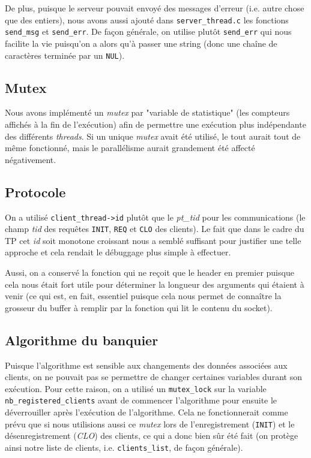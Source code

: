 \documentclass[11pt]{article}
\begin{document}
De plus, puisque le serveur pouvait envoyé des messages d'erreur (i.e. autre chose que des entiers), nous avons aussi ajouté dans \texttt{server\_thread.c} les fonctions \texttt{send\_msg} et \texttt{send\_err}. De façon générale, on utilise plutôt \texttt{send\_err} qui nous facilite la vie puisqu'on a alors qu'à passer une string (donc une chaîne de caractères terminée par un \texttt{NUL}).

\subsection{Mutex}

Nous avons implémenté un \textit{mutex} par "variable de statistique" (les compteurs affichés à la fin de l'exécution) afin de permettre une exécution plus indépendante des différents \textit{threads}. Si un unique \textit{mutex} avait été utilisé, le tout aurait tout de même fonctionné, mais le parallélisme aurait grandement été affecté négativement.


\subsection{Protocole}

On a utilisé \texttt{client\_thread->id} plutôt que le \textit{pt\_tid} pour les communications (le champ \textit{tid} des requêtes \texttt{INIT}, \texttt{REQ} et \texttt{CLO} des clients). Le fait que dans le cadre du TP cet \textit{id} soit monotone croissant nous a semblé suffisant pour justifier une telle approche et cela rendait le débuggage plus simple à effectuer.

Aussi, on a conservé la fonction qui ne reçoit que le header en premier puisque cela nous était fort utile pour déterminer la longueur
des arguments qui étaient à venir (ce qui est, en fait, essentiel puisque cela nous permet de connaître la grosseur du buffer à remplir par la fonction qui lit le contenu du socket).


\subsection{Algorithme du banquier}

Puisque l'algorithme est sensible aux changements des données associées aux clients, on ne pouvait pas se permettre de changer certaines variables durant son exécution. Pour cette raison, on a utilisé un \texttt{mutex\_lock} sur la variable \texttt{nb\_registered\_clients} avant de commencer l'algorithme pour ensuite le déverrouiller après l'exécution de l'algorithme. Cela ne fonctionnerait comme prévu que si nous utilisions aussi ce \textit{mutex} lors de l'enregistrement (\texttt{INIT}) et le désenregistrement (\textit{CLO}) des clients, ce qui a donc bien sûr été fait (on protège ainsi notre liste de clients, i.e. \texttt{clients\_list}, de façon générale).
\end{document}
